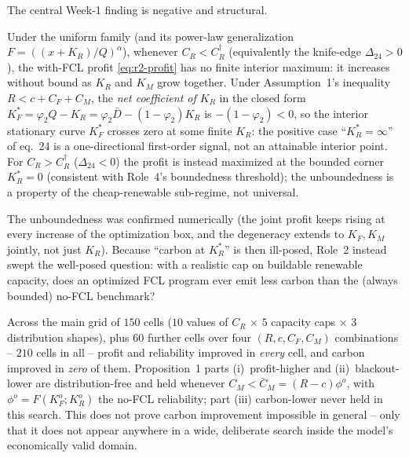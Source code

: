 The central Week-1 finding is negative and structural.

\begin{proposition}
\label{prop:r2-no-finite-opt}
Under the uniform family (and its power-law generalization
$F=((x+K_R)/Q)^{\alpha}$), whenever $C_R<C_R^{\dagger}$ (equivalently the knife-edge
$\Delta_{24}>0$), the with-FCL profit \eqref{eq:r2-profit} has no finite interior
maximum: it increases without bound as $K_R$ and $K_M$ grow together. Under
Assumption~1's inequality $R<c+C_F+C_M$, the \emph{net coefficient of $K_R$} in the
closed form $K_F^{*}=\varphi_2 Q-K_R=\varphi_2\bar D-(1-\varphi_2)K_R$ is
$-(1-\varphi_2)<0$, so the interior stationary curve $K_F^{*}$ crosses zero at some
finite $K_R$: the positive case ``$K_R^{*}=\infty$'' of eq.~24 is a one-directional
first-order signal, not an attainable interior point. For $C_R>C_R^{\dagger}$
($\Delta_{24}<0$) the profit is instead maximized at the bounded corner $K_R^{*}=0$
(consistent with Role~4's boundedness threshold); the unboundedness is a property of
the cheap-renewable sub-regime, not universal.
\end{proposition}

The unboundedness was confirmed numerically (the joint profit keeps rising at
every increase of the optimization box, and the degeneracy extends to $K_F,K_M$
jointly, not just $K_R$). Because ``carbon at $K_R^{*}$'' is then ill-posed,
Role~2 instead swept the well-posed question: with a realistic cap on buildable
renewable capacity, does an optimized FCL program ever emit less carbon than the
(always bounded) no-FCL benchmark?

\begin{remark}
\label{rem:r2-sweep}
Across the main grid of $150$ cells ($10$ values of $C_R$ $\times$ $5$ capacity
caps $\times$ $3$ distribution shapes), plus $60$ further cells over four
$(R,c,C_F,C_M)$ combinations -- $210$ cells in all -- profit and reliability
improved in \emph{every} cell, and carbon improved in \emph{zero} of them.
Proposition~1 parts (i)~profit-higher and (ii)~blackout-lower are
distribution-free and held whenever $C_M<\bar C_M=(R-c)\phi^{o}$, with
$\phi^{o}=F(K_F^{o};K_R^{o})$ the no-FCL reliability; part (iii) carbon-lower
never held in this search. This does not prove carbon improvement impossible in
general -- only that it does not appear anywhere in a wide, deliberate search
inside the model's economically valid domain.
\end{remark}

